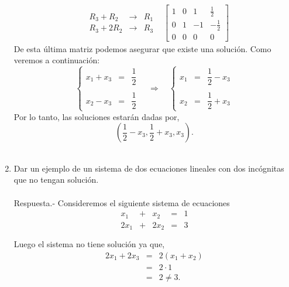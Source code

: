 \begin{enumerate}[\bfseries 1.]
$$\begin{array}{rcl}
	&
	\begin{array}{rcl}
	    R_3+R_2 &\to& R_1\\
	    R_3+2R_2 &\to& R_3
	\end{array}
	&
	\left[\begin{array}{rrr|r}
	    1 & 0 & 1 & \frac{1}{2} \\
	    0 & 1 & -1 & -\frac{1}{2} \\
	    0 & 0 & 0 & 0
	\end{array}\right]
	\end{array}
	$$
	De esta última matriz podemos asegurar que existe una solución. Como veremos a continuación:
	$$\left\{
	\begin{array}{rcl}
	    x_1+x_3 &=& \dfrac{1}{2}\\\\
	    x_2-x_3 &=& \dfrac{1}{2}
	\end{array}\right. 
	\quad \Rightarrow \quad
	\left\{\begin{array}{rcl}
	    x_1 &=& \dfrac{1}{2}-x_3\\\\
	    x_2 &=& \dfrac{1}{2}+x_3
	\end{array}\right.
	$$
	Por lo tanto, las soluciones estarán dadas por,
	$$\left(\dfrac{1}{2}-x_3,\dfrac{1}{2}+x_3,x_3\right).$$\\

    \item Dar un ejemplo de un sistema de dos ecuaciones lineales con dos incógnitas que no tengan solución.\\\\
	Respuesta.-\; Consideremos el siguiente sistema de ecuaciones 
	$$\begin{array}{rcccl}
	    x_1&+&x_2&=&1\\
	    2x_1&+&2x_2&=&3\\\\
	\end{array}$$
	Luego el sistema no tiene solución ya que,
	$$\begin{array}{rcl}
	    2x_1+2x_3&=&2(x_1+x_2)\\
		     &=&2\cdot 1\\
		     &=&2\neq 3.
	\end{array}$$
	\vspace{.6cm}\\\\


\end{enumerate}
